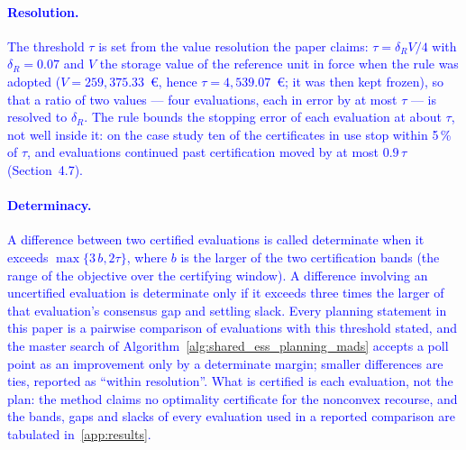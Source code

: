 \textcolor{blue}{\paragraph{Resolution.} The threshold $\tau$ is set from the value resolution the paper claims:
$\tau = \delta_R V / 4$ with $\delta_R = 0.07$ and $V$ the storage value of the reference unit in force when the
rule was adopted ($V = 259{,}375.33$~\euro{}, hence $\tau = 4{,}539.07$~\euro{}; it was then kept frozen), so
that a ratio of two values --- four evaluations, each in error by at most $\tau$ --- is resolved to
$\delta_R$. The rule bounds the stopping error of each evaluation at about $\tau$, not well inside it: on the
case study ten of the certificates in use stop within 5\,\% of $\tau$, and evaluations continued past
certification moved by at most $0.9\,\tau$ (Section~4.7).}

\textcolor{blue}{\paragraph{Determinacy.} A difference between two certified evaluations is called determinate
when it exceeds $\max\{3\,b, 2\tau\}$, where $b$ is the larger of the two certification bands (the range of
the objective over the certifying window). A difference involving an uncertified evaluation is determinate
only if it exceeds three times the larger of that evaluation's consensus gap and settling slack. Every
planning statement in this paper is a pairwise comparison of evaluations with this threshold stated, and the
master search of Algorithm~\ref{alg:shared_ess_planning_mads} accepts a poll point as an improvement only by a
determinate margin; smaller differences are ties, reported as ``within resolution''. What is certified is
each evaluation, not the plan: the method claims no optimality certificate for the nonconvex recourse, and
the bands, gaps and slacks of every evaluation used in a reported comparison are tabulated in~\ref{app:results}.}



